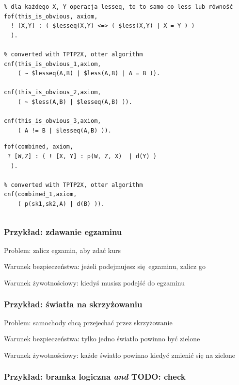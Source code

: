 \documentclass[a4paper,12pt]{article}
\begin{document}
\begin{verbatim}
% dla każdego X, Y operacja lesseq, to to samo co less lub równość
fof(this_is_obvious, axiom,
  ! [X,Y] : ( $lesseq(X,Y) <=> ( $less(X,Y) | X = Y ) )
  ).

% converted with TPTP2X, otter algorithm
cnf(this_is_obvious_1,axiom,
    ( ~ $lesseq(A,B) | $less(A,B) | A = B )).

cnf(this_is_obvious_2,axiom,
    ( ~ $less(A,B) | $lesseq(A,B) )).

cnf(this_is_obvious_3,axiom,
    ( A != B | $lesseq(A,B) )).
\end{verbatim}

\begin{verbatim}
fof(combined, axiom,
 ? [W,Z] : ( ! [X, Y] : p(W, Z, X)  | d(Y) )
  ).

% converted with TPTP2X, otter algorithm
cnf(combined_1,axiom,
    ( p(sk1,sk2,A) | d(B) )).
\end{verbatim}

\begin{verbatim}
\end{verbatim}


\subsubsection{Przykład: zdawanie egzaminu}

\noindent
Problem: zalicz egzamin, aby zdać kurs

\noindent
Warunek bezpieczeństwa: jeżeli podejmujesz się egzaminu, zalicz go

\noindent
Warunek żywotnościowy: kiedyś musisz podejść do egzaminu

\subsubsection{Przykład: światła na skrzyżowaniu}

\noindent
Problem: samochody chcą przejechać przez skrzyżowanie

\noindent
Warunek bezpieczeństwa: tylko jedno światło powinno być zielone

\noindent
Warunek żywotnościowy: każde światło powinno kiedyć zmienić się na zielone

\subsubsection{Przykład: bramka logiczna \textit{and} TODO: check}
\end{document}

